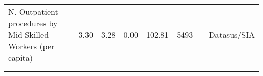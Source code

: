 \begin{table}[H]
\begin{footnotesize}
\begin{center}
{\begin{threeparttable}[b]
\begin{tabular}{rrrrrrrr}
    \multicolumn{1}{l}{N. Outpatient procedures by Mid Skilled Workers (per capita)} & \multicolumn{1}{c}{3.30} & \multicolumn{1}{c}{3.28} & \multicolumn{1}{c}{0.00} & \multicolumn{1}{c}{102.81} & \multicolumn{1}{c}{5493} &       & \multicolumn{1}{c}{Datasus/SIA} \\
          &       &       &       &       &       &       &  \\
    \midrule
    \midrule
          &       &       &       &       &       &       &  \\
    \end{tabular}%
    



\end{threeparttable}
}
\end{center}
\end{footnotesize}
\end{table}